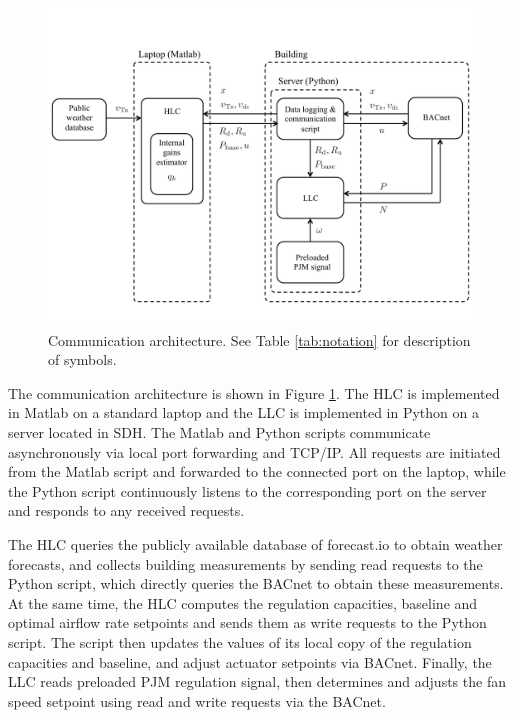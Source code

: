 \begin{figure}[t]
\centering
\includegraphics[scale=0.35]{chapters/building_exp/figures/comm_architecture.pdf}
\caption{Communication architecture. See Table \ref{tab:notation} for description of symbols.}
\label{fig:comm_architecture}
\end{figure}
The communication architecture is shown in Figure \ref{fig:comm_architecture}.
The HLC is implemented in Matlab on a standard laptop and the LLC is implemented in Python on a server located in SDH.
The Matlab and Python scripts communicate asynchronously via local port forwarding and TCP/IP.
All requests are initiated from the Matlab script and forwarded to the connected port on the laptop, while the Python script continuously listens to the corresponding port on the server and responds to any received requests.

The HLC queries the publicly available database of forecast.io to obtain weather forecasts, and collects building measurements by sending read requests to the Python script, which directly queries the BACnet to obtain these measurements. 
At the same time, the HLC computes the regulation capacities, baseline and optimal airflow rate setpoints and sends them as write requests to the Python script. The script then updates the values of its local copy of the regulation capacities and baseline, and adjust actuator setpoints via BACnet.
Finally, the LLC reads preloaded PJM regulation signal, then determines and adjusts the fan speed setpoint using read and write requests via the BACnet.  



